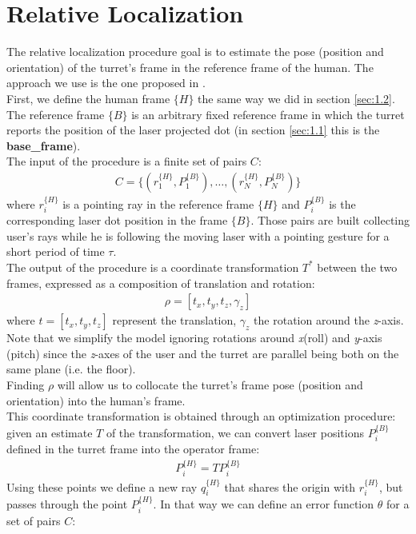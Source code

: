 \section{Relative Localization} \label{sec:relloc}
The relative localization procedure goal is to estimate the pose (position and orientation) of the turret's frame in the reference frame of the human. The approach we use is the one proposed in \cite{gromov2018robot}.\\
First, we define the human frame $\{H\}$ the same way we did in section \ref{sec:1.2}. The reference frame $\{B\}$ is an arbitrary fixed reference frame in which the turret reports the position of the laser projected dot (in section \ref{sec:1.1} this is the \textbf{base\_frame}).\\ The input of the procedure is a finite set of pairs $C$:
\begin{align}
    C=\{(r_1^{\{H\}},P_1^{\{B\}}), \dots,(r_N^{\{H\}},P_N^{\{B\}})\}\nonumber
\end{align}
where $r_i^{\{H\}}$ is a pointing ray in the reference frame $\{H\}$ and $P_i^{\{B\}}$ is the corresponding laser dot position in the frame $\{B\}$. Those pairs are built collecting user's rays while he is following the moving laser with a pointing gesture for a short period of time $\tau$.\\
The output of the procedure is a coordinate transformation $T^*$ between the two frames, expressed as a composition of translation and rotation: 
\begin{align}
	\rho = [t_x, t_y, t_z, \gamma_z] \nonumber
\end{align}
where $t=[t_x, t_y, t_z]$ represent the translation, $\gamma_z$ the rotation around the \emph{z}-axis. Note that we simplify the model ignoring rotations around \emph{x}(roll) and \emph{y}-axis (pitch)  since the \emph{z}-axes of the user and the turret are parallel being both on the same plane (i.e. the floor).\\ Finding $\rho$ will allow us to collocate the turret's frame pose (position and orientation) into the human's frame.\\
This coordinate transformation is obtained through an optimization procedure: given an estimate $T$ of the transformation, we can convert laser positions $P_i^{\{B\}}$ defined in the turret frame into the operator frame:
\begin{align}
	P_i^{\{H\}}= TP_i^{\{B\}} \nonumber
\end{align}
Using these points we define a new ray $q_i^{\{H\}}$ that shares the origin with $r_i^{\{H\}}$, but passes through the point $P_i^{\{H\}}$. In that way we can define an error function $\theta$ for a set of pairs $C$:
